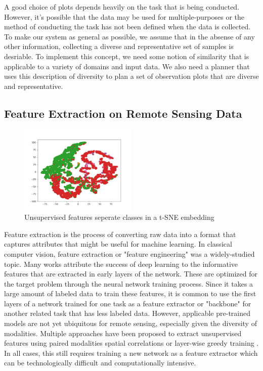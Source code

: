 A good choice of plots depends heavily on the task that is being conducted. However, it's possible that the data may be used for multiple-purposes or the method of conducting the task has not been defined when the data is collected. To make our system as general as possible, we assume that in the absense of any other information, collecting a diverse and representative set of samples is desriable. To implement this concept, we need some notion of similarity that is applicable to a variety of domains and input data. We also need a planner that uses this description of diversity to plan a set of observation plots that are diverse and representative.


\subsection{Feature Extraction on Remote Sensing Data}
\begin{figure}
    \centering
    \includegraphics[width=0.5\textwidth]{figs/methods/IPP/TSNE_features.png}
    \caption{Unsupervised features seperate classes in a t-SNE embedding}
    \label{fig:methods:ipp_feature_embedding}
\end{figure}
Feature extraction is the process of converting raw data into a format that captures attributes that might be useful for machine learning. In classical computer vision, feature extraction or "feature engineering" was a widely-studied topic. Many works attribute the success of deep learning to the informative features that are extracted in early layers of the network. These are optimized for the target problem through the neural network training process. Since it takes a large amount of labeled data to train these features, it is common to use the first layers of a network trained for one task as a feature extractor or "backbone" for another related task that has less labeled data. However, applicable pre-trained models are not yet ubiquitous for remote sensing, especially given the diversity of modalities. Multiple approaches have been proposed to extract unsupervised features using paired modalities \cite{Xie2016TransferMapping} spatial correlations \cite{Jean2019Tile2Vec:Data} or layer-wise greedy training \cite{Romero2016UnsupervisedClassification}. In all cases, this still requires training a new network as a feature extractor which can be technologically difficult and computationally intensive.

